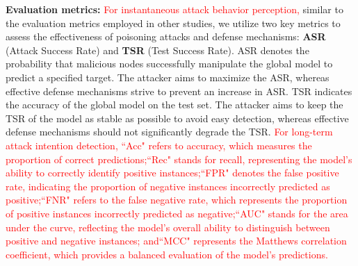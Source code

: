 \documentclass[lettersize,journal]{IEEEtran}
\begin{document}
\textbf{Evaluation metrics:}
\textcolor{red}{For instantaneous attack behavior perception,} similar to the evaluation metrics employed in other studies\cite{tang2023port, jin2024learning, rong2023special}, we utilize two key metrics to assess the effectiveness of poisoning attacks and defense mechanisms: \textbf{ASR} (Attack Success Rate) and \textbf{TSR} (Test Success Rate). ASR denotes the probability that malicious nodes successfully manipulate the global model to predict a specified target. The attacker aims to maximize the ASR, whereas effective defense mechanisms strive to prevent an increase in ASR. TSR indicates the accuracy of the global model on the test set. The attacker aims to keep the TSR of the model as stable as possible to avoid easy detection, whereas effective defense mechanisms should not significantly degrade the TSR. \textcolor{red}{For long-term attack intention detection, ``Acc" refers to accuracy, which measures the proportion of correct predictions;``Rec" stands for recall, representing the model's ability to correctly identify positive instances;``FPR" denotes the false positive rate, indicating the proportion of negative instances incorrectly predicted as positive;``FNR" refers to the false negative rate, which represents the proportion of positive instances incorrectly predicted as negative;``AUC" stands for the area under the curve, reflecting the model's overall ability to distinguish between positive and negative instances; and``MCC" represents the Matthews correlation coefficient, which provides a balanced evaluation of the model's predictions.}
\end{document}
